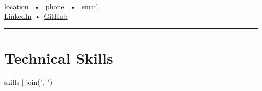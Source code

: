 \documentclass[11pt]{article}
\begin{document}
\fontsize{8pt}{10pt}\selectfont

\begin{center}
  {\namefont\bfseries\fontsize{18pt}{20pt} }\\[-2pt]
  {{ location }}~•~{{ phone }}~•~\href{mailto:{{ email }}}{{ email }} \\[-2pt]
  \href{https://linkedin.com/in/{{ linkedin }}}{LinkedIn}~•~\href{https://github.com/{{ github }}}{GitHub}
\end{center}

\vspace{0.4cm}
\rule{\linewidth}{0.4pt}

\section*{Technical Skills}
{{ skills | join(", ") }}

\end{document}
